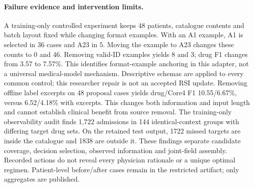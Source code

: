 \paragraph{Failure evidence and intervention limits.}
A training-only controlled experiment keeps 48 patients, catalogue contents and batch layout fixed while changing format examples. With an A1 example, A1 is selected in 36 cases and A23 in 5. Moving the example to A23 changes these counts to 0 and 46. Removing valid-ID examples yields 8 and 3; drug F1 changes from 3.57 to 7.57\%. This identifies format-example anchoring in this adapter, not a universal medical-model mechanism. Descriptive schemas are applied to every common control; this researcher repair is not an accepted RSI update. Removing offline label excerpts on 48 proposal cases yields drug/Core4 F1 10.55/6.67\%, versus 6.52/4.18\% with excerpts. This changes both information and input length and cannot establish clinical benefit from source removal. The training-only observability audit finds 1,722 admissions in 144 identical-context groups with differing target drug sets. On the retained test output, 1722 missed targets are inside the catalogue and 1838 are outside it.
These findings separate candidate coverage, decision selection, observed information and joint-field assembly. Recorded actions do not reveal every physician rationale or a unique optimal regimen. Patient-level before/after cases remain in the restricted artifact; only aggregates are published.

